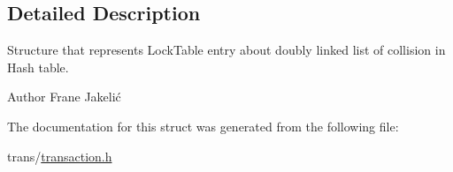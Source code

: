 \subsection{Detailed Description}
Structure that represents Lock\+Table entry about doubly linked list of collision in Hash table. 

\begin{DoxyAuthor}{Author}
Frane Jakelić 
\end{DoxyAuthor}


The documentation for this struct was generated from the following file\+:\begin{DoxyCompactItemize}
\item 
trans/\hyperlink{transaction_8h}{transaction.\+h}\end{DoxyCompactItemize}
